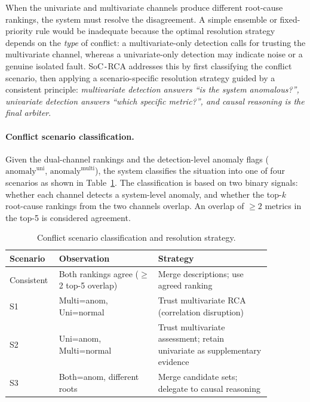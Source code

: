 \documentclass[a4paper,fleqn]{cas-dc}
\newcommand{\sysname}{SoC\texttt{-}RCA}
\begin{document}
When the univariate and multivariate channels produce different root-cause rankings, the system must resolve the disagreement.  A simple ensemble or fixed-priority rule would be inadequate because the optimal resolution strategy depends on the \emph{type} of conflict: a multivariate-only detection calls for trusting the multivariate channel, whereas a univariate-only detection may indicate noise or a genuine isolated fault.  \sysname{} addresses this by first classifying the conflict scenario, then applying a scenario-specific resolution strategy guided by a consistent principle: \emph{multivariate detection answers ``is the system anomalous?'', univariate detection answers ``which specific metric?'', and causal reasoning is the final arbiter}.

\paragraph{Conflict scenario classification.}
Given the dual-channel rankings and the detection-level anomaly flags ($\text{anomaly}^{\text{uni}}$, $\text{anomaly}^{\text{multi}}$), the system classifies the situation into one of four scenarios as shown in Table~\ref{tab:scenarios}.  The classification is based on two binary signals: whether each channel detects a system-level anomaly, and whether the top-$k$ root-cause rankings from the two channels overlap.  An overlap of $\geq 2$ metrics in the top-5 is considered agreement.

\begin{table}[h]
  \centering
  \caption{Conflict scenario classification and resolution strategy.}
  \label{tab:scenarios}
  \begin{tabular}{@{}p{0.12\linewidth}p{0.35\linewidth}p{0.40\linewidth}@{}}
    \toprule
    \textbf{Scenario} & \textbf{Observation} & \textbf{Strategy} \\
    \midrule
    Consistent & Both rankings agree ($\geq$2 top-5 overlap) & Merge descriptions; use agreed ranking \\
    S1 & Multi=anom, Uni=normal & Trust multivariate RCA (correlation disruption) \\
    S2 & Uni=anom, Multi=normal & Trust multivariate assessment; retain univariate as supplementary evidence \\
    S3 & Both=anom, different roots & Merge candidate sets; delegate to causal reasoning \\
    \bottomrule
  \end{tabular}
\end{table}
\end{document}
